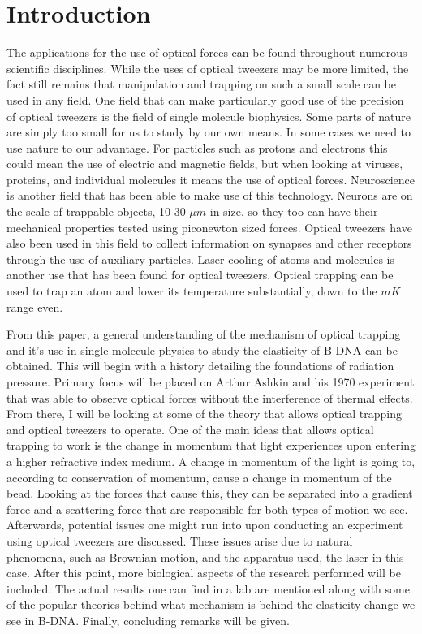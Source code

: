 \documentclass[%
 aip,
 amsmath,amssymb,
 reprint,%
]{revtex4-1}
\begin{document}
\section{\label{sec:level1}Introduction\protect}
    The applications for the use of optical forces can be found throughout numerous scientific disciplines. While the uses of optical tweezers may be more limited, the fact still remains that manipulation and trapping on such a small scale can be used in any field. One field that can make particularly good use of the precision of optical tweezers is the field of single molecule biophysics. Some parts of nature are simply too small for us to study by our own means. In some cases we need to use nature to our advantage. For particles such as protons and electrons this could mean the use of electric and magnetic fields, but when looking at viruses, proteins, and individual molecules it means the use of optical forces. Neuroscience is another field that has been able to make use of this technology. Neurons are on the scale of trappable objects, 10-30 $\mu m$ in size, so they too can have their mechanical properties tested using piconewton sized forces. Optical tweezers have also been used in this field to collect information on synapses and other receptors through the use of auxiliary particles\cite{neuro}. Laser cooling of atoms and molecules is another use that has been found for optical tweezers\cite{cooling}. Optical trapping can be used to trap an atom and lower its temperature substantially, down to the $mK$ range even. 
    
    From this paper, a general understanding of the mechanism of optical trapping and it's use in single molecule physics to study the elasticity of B-DNA can be obtained. This will begin with a history detailing the foundations of radiation pressure. Primary focus will be placed on Arthur Ashkin and his 1970 experiment that was able to observe optical forces without the interference of thermal effects\cite{ashkin}. From there, I will be looking at some of the theory that allows optical trapping and optical tweezers to operate. One of the main ideas that allows optical trapping to work is the change in momentum that light experiences upon entering a higher refractive index medium. A change in momentum of the light is going to, according to conservation of momentum, cause a change in momentum of the bead. Looking at the forces that cause this, they can be separated into a gradient force and a scattering force that are responsible for both types of motion we see. Afterwards, potential issues one might run into upon conducting an experiment using optical tweezers are discussed. These issues arise due to natural phenomena, such as Brownian motion, and the apparatus used, the laser in this case. After this point, more biological aspects of the research performed will be included. The actual results one can find in a lab are mentioned along with some of the popular theories behind what mechanism is behind the elasticity change we see in B-DNA. Finally, concluding remarks will be given.
    
\end{document}
